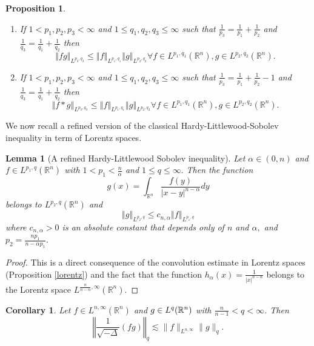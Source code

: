 \documentclass[11pt]{amsart}%
\theoremstyle{plain}
\numberwithin{equation}{section}
\newtheorem{corollary}{Corollary}[section]
\newtheorem{lemma}{Lemma}[section]
\newtheorem{proposition}{Proposition}[section]
\begin{document}
\begin{proposition}
\begin{enumerate}
\item If $1<p_{1},p_{2},p_{3}<\infty $ and $1\leq q_{1},q_{2},q_{3}\leq
\infty $ such that $\frac{1}{p_{3}}=\frac{1}{p_{1}}+\frac{1}{p_{2}}$ and $%
\frac{1}{q_{3}}=\frac{1}{q_{1}}+\frac{1}{q_{2}}$ then%
\[
\left\Vert fg\right\Vert _{L^{p_{3},q_{3}}}\leq \left\Vert f\right\Vert
_{L^{p_{1},q_{1}}}\left\Vert g\right\Vert _{L^{p_{2},q_{2}}}\forall f\in
L^{p_{1},q_{1}}(\mathbb{R}^{n}),g\in L^{p_{2},q_{2}}(\mathbb{R}^{n}).
\]

\item If $1<p_{1},p_{2},p_{3}<\infty $ and $1\leq q_{1},q_{2},q_{3}\leq
\infty $ such that $\frac{1}{p_{3}}=\frac{1}{p_{1}}+\frac{1}{p_{2}}-1$ and $%
\frac{1}{q_{3}}=\frac{1}{q_{1}}+\frac{1}{q_{2}}$ then%
\[
\left\Vert f\ast g\right\Vert _{L^{p_{3},q_{3}}}\leq \left\Vert f\right\Vert
_{L^{p_{1},q_{1}}}\left\Vert g\right\Vert _{L^{p_{2},q_{2}}}\forall f\in
L^{p_{1},q_{1}}(\mathbb{R}^{n}),g\in L^{p_{2},q_{2}}(\mathbb{R}^{n}).
\]
\end{enumerate}
\end{proposition}
We now recall a refined version of the  classical Hardy-Littlewood-Sobolev inequality in term of Lorentz spaces.
\begin{lemma}[A refined Hardy-Littlewood Sobolev inequality]\label{hardy}
Let $\alpha \in (0,n)$ and $f\in L^{p_{1},q}(\mathbb{R}^{n})$ with $1<p_{1}<%
\frac{n}{\alpha }$ and $1\leq q\leq \infty .$ Then the function
\[
g(x)=\int_{\mathbb{R}^n}\frac{f(y)}{\left\vert x-y\right\vert ^{n-\alpha }}dy
\]%
belongs to $L^{p_{2},q}(\mathbb{R}^{n})$ and
\[
\left\Vert g\right\Vert _{L^{p_{2},q}}\leq c_{n,\alpha }\left\Vert f\right\Vert
_{L^{p_{1},q}}
\]%
where $c_{n,\alpha }>0$ is an absolute constant that depends only of $n$ and
$\alpha ,$ and $p_2=\frac{n p_1}{n-\alpha p_1}$.
\end{lemma}
\begin{proof}
This is a direct consequence of the convolution estimate  in Lorentz spaces (Proposition \ref{lorentz}) and the fact that the function $h_{\alpha
}(x)=\frac{1}{\left\vert x\right\vert ^{n-\alpha }}$ belongs to the Lorentz
space $L^{\frac{n}{n-\alpha },\infty }(\mathbb{R}^{n})$.
\end{proof}

\begin{corollary}\label{Mon}
Let $f\in L^{n,\infty }(\mathbb{R}^{n})$ and $g\in L^{q}(\mathbb{%
R}^{n})$  with $\frac{n}{n-1}<q<\infty$. Then%
\[
\left\Vert \frac{1}{\sqrt{-\Delta }}(fg)\right\Vert _{q}\lesssim \|f\|_{L^{n,\infty}} \|g\|_{q}.
\]
\end{corollary}
\end{document}
